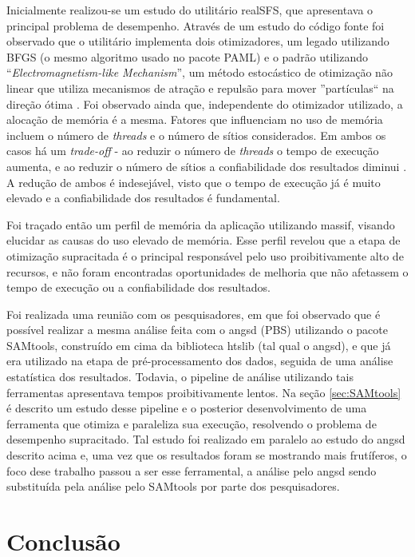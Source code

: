 \documentclass[cic,tc]{iiufrgs}
\begin{document}
Inicialmente realizou-se um estudo do utilitário realSFS, que apresentava o
principal problema de desempenho. Através de um estudo do código fonte foi
observado que o utilitário implementa dois otimizadores, um legado utilizando
BFGS (o mesmo algoritmo usado no pacote PAML) e o padrão utilizando
``\textit{Electromagnetism-like Mechanism}'', um método estocástico de otimização
não linear que utiliza mecanismos de atração e repulsão para mover
''partículas`` na direção ótima \cite{5636954}. Foi observado ainda que,
independente do otimizador utilizado, a alocação de memória é a mesma. Fatores
que influenciam no uso de memória incluem o número de \textit{threads} e o número de
sítios considerados. Em ambos os casos há um \textit{trade-off} - ao reduzir o
número de \textit{threads} o tempo de execução aumenta, e ao reduzir o número de sítios
a confiabilidade dos resultados diminui \cite{popgen2016angsd}. A redução de
ambos é indesejável, visto que o tempo de execução já é muito elevado e a
confiabilidade dos resultados é fundamental.

Foi traçado então um perfil de memória da aplicação utilizando massif,
visando elucidar as causas do uso elevado de memória. Esse perfil revelou que a
etapa de otimização supracitada é o principal responsável pelo uso
proibitivamente alto de recursos, e não foram encontradas oportunidades de
melhoria que não afetassem o tempo de execução ou a confiabilidade dos
resultados.

Foi realizada uma reunião com os pesquisadores, em que foi observado que é
possível realizar a mesma análise feita com o angsd (PBS) utilizando o pacote
SAMtools, construído em cima da biblioteca htslib (tal qual o angsd), e que já
era utilizado na etapa de pré-processamento dos dados, seguida de uma análise
estatística dos resultados. Todavia, o pipeline de análise utilizando tais
ferramentas apresentava tempos proibitivamente lentos. Na seção
\ref{sec:SAMtools} é descrito um estudo desse pipeline e o posterior
desenvolvimento de uma ferramenta que otimiza e paraleliza sua execução,
resolvendo o problema de desempenho supracitado. Tal estudo foi realizado em
paralelo ao estudo do angsd descrito acima e, uma vez que os resultados foram
se mostrando mais frutíferos, o foco dese trabalho passou a ser esse
ferramental, a análise pelo angsd sendo substituída pela análise pelo SAMtools
por parte dos pesquisadores.

%
%
%
%
\chapter{Conclusão}
\label{chap:conc}
\end{document}
